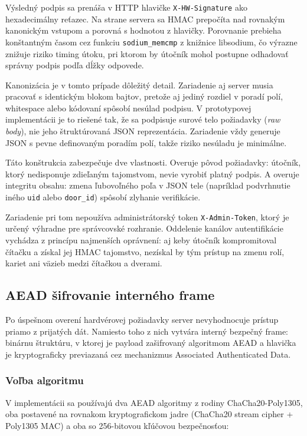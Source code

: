 \documentclass[journal,a4paper,onecolumn]{IEEEtran}
\begin{document}
Výsledný podpis sa prenáša v HTTP hlavičke \texttt{X-HW-Signature} ako hexadecimálny reťazec. Na strane servera sa HMAC prepočíta nad rovnakým kanonickým vstupom a porovná s hodnotou z hlavičky. Porovnanie prebieha konštantným časom cez funkciu \texttt{sodium\_memcmp} z knižnice libsodium, čo výrazne znižuje riziko timing útoku, pri ktorom by útočník mohol postupne odhadovať správny podpis podľa dĺžky odpovede\cite{FIPS1981,RFC2104}.

Kanonizácia je v tomto prípade dôležitý detail. Zariadenie aj server musia pracovať s identickým blokom bajtov, pretože aj jediný rozdiel v poradí polí, whitespace alebo kódovaní spôsobí nesúlad podpisu. V prototypovej implementácii je to riešené tak, že sa podpisuje surové telo požiadavky (\emph{raw body}), nie jeho štruktúrovaná JSON reprezentácia. Zariadenie vždy generuje JSON s pevne definovaným poradím polí, takže riziko nesúladu je minimálne.

Táto konštrukcia zabezpečuje dve vlastnosti. Overuje pôvod požiadavky: útočník, ktorý nedisponuje zdieľaným tajomstvom, nevie vyrobiť platný podpis. A overuje integritu obsahu: zmena ľubovoľného poľa v JSON tele (napríklad podvrhnutie iného \texttt{uid} alebo \texttt{door\_id}) spôsobí zlyhanie verifikácie.

Zariadenie pri tom nepoužíva administrátorský token \texttt{X-Admin-Token}, ktorý je určený výhradne pre správcovské rozhranie. Oddelenie kanálov autentifikácie vychádza z princípu najmenších oprávnení: aj keby útočník kompromitoval čítačku a získal jej HMAC tajomstvo, nezískal by tým prístup na zmenu rolí, kariet ani väzieb medzi čítačkou a dverami\cite{OWASPAPI2023}.

\subsection{AEAD šifrovanie interného frame}

Po úspešnom overení hardvérovej požiadavky server nevyhodnocuje prístup priamo z prijatých dát. Namiesto toho z nich vytvára interný bezpečný frame: binárnu štruktúru, v ktorej je payload zašifrovaný algoritmom AEAD a hlavička je kryptograficky previazaná cez mechanizmus Associated Authenticated Data.

\subsubsection{Voľba algoritmu}

V implementácii sa používajú dva AEAD algoritmy z rodiny ChaCha20-Poly1305, oba postavené na rovnakom kryptografickom jadre (ChaCha20 stream cipher + Poly1305 MAC) a oba so 256-bitovou kľúčovou bezpečnosťou:
\end{document}
